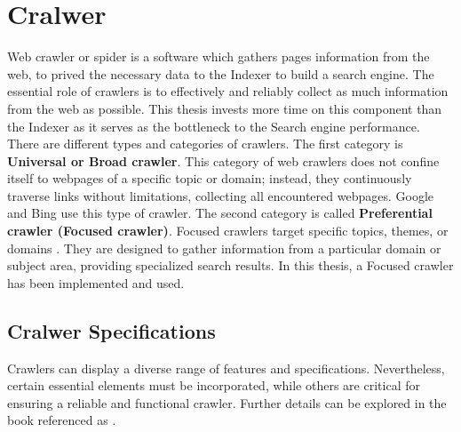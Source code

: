 \section{Cralwer}
\label{sec:crawler}
Web crawler or spider is a software which gathers pages information from the web, to prived the necessary data to the Indexer to build a search engine. The essential role of crawlers is to effectively and reliably collect as much information from the web as possible. This thesis invests more time on this component than the Indexer as it serves as the bottleneck to the Search engine performance. There are different types and categories of crawlers. The first category is  \textbf{Universal or Broad crawler}. This category of web crawlers does not confine itself to webpages of a specific topic or domain; instead, they continuously traverse links without limitations, collecting all encountered webpages. Google and Bing use this type of crawler. The second category is called \textbf{Preferential crawler (Focused crawler)}. Focused crawlers target specific topics, themes, or domains \cite{wires}. They are designed to gather information from a particular domain or subject area, providing specialized search results. In this thesis, a Focused crawler has been implemented and used. 

\subsection{Cralwer Specifications}
\label{sec:cralwer-specifications}
Crawlers can display a diverse range of features and specifications. Nevertheless, certain essential elements must be incorporated, while others are critical for ensuring a reliable and functional crawler. Further details can be explored in the book referenced as \cite{introduction-ir}.

